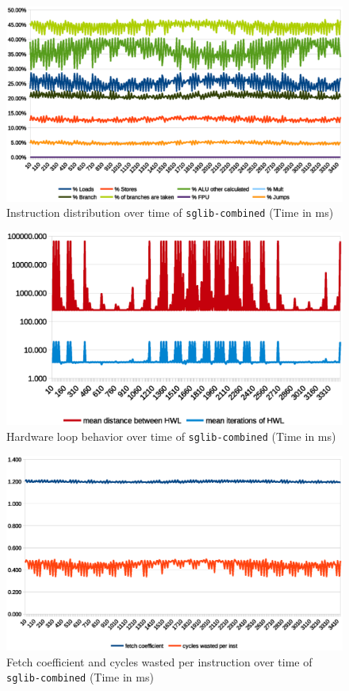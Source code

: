 \documentclass[../bachelor_paper.tex]{subfiles}
\begin{document}
\begin{figure}
    \centering
    \includegraphics[width=\textwidth]{img/graph/embench/sglib-combined_inst.eps}
    \caption{Instruction distribution over time of \texttt{sglib-combined} (Time in ms)}
    \label{fig:res/sglib/inst}
\end{figure}

\begin{figure}
    \centering
    \includegraphics[width=\textwidth]{img/graph/embench/sglib-combined_hwl.eps}
    \caption{Hardware loop behavior over time of \texttt{sglib-combined} (Time in ms)}
    \label{fig:res/sglib/hwl}
\end{figure}

\begin{figure}
    \centering
    \includegraphics[width=\textwidth]{img/graph/embench/sglib-combined_fetch_waste.eps}
    \caption{Fetch coefficient and cycles wasted per instruction over time of \texttt{sglib-combined} (Time in ms)}
    \label{fig:res/sglib/fetch_waste}
\end{figure}
\end{document}
